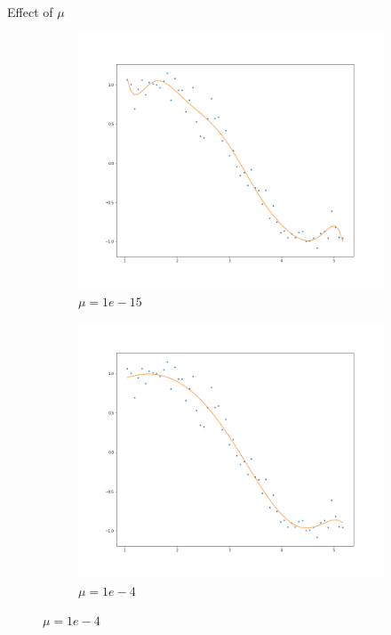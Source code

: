 \documentclass{beamer}
\begin{document}
\begin{frame}{Effect of $\mu$}
\begin{figure}
        \begin{subfigure}[b]{0.5\textwidth}
                \includegraphics[width=\linewidth]{ridge/rid_plot_15.png}
                \caption{$\mu = 1e-15$}
        \end{subfigure}%
        \begin{subfigure}[b]{0.5\textwidth}
                \includegraphics[width=\linewidth]{ridge/rid_plot_4.png}
                \caption{$\mu = 1e-4$}
        \end{subfigure}%
\end{figure}
\end{frame} 
\end{document}
